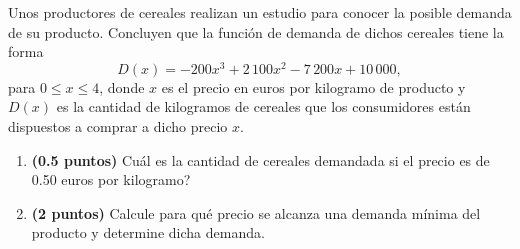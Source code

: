 
Unos productores de cereales realizan un estudio para conocer la posible
demanda de su producto. Concluyen que la función de demanda de dichos cereales
tiene la forma
\[
  D(x)=-200x^3+2\,100x^2-7\,200x+10\,000,
\]
para $0\leq x\leq 4$, donde $x$ es el precio en euros por kilogramo de
producto y $D(x)$ es la cantidad de kilogramos de cereales que los consumidores
están dispuestos a comprar a dicho precio $x$.
\begin{enumerate}[label=\alph*)]
  \item \textbf{(0.5 puntos)} \textquestiondown{}Cuál es la cantidad de
  cereales demandada si el precio es de 0.50 euros por kilogramo?
  \item \textbf{(2 puntos)} Calcule para qué precio se alcanza una demanda
  mínima del producto y determine dicha demanda.
\end{enumerate}
